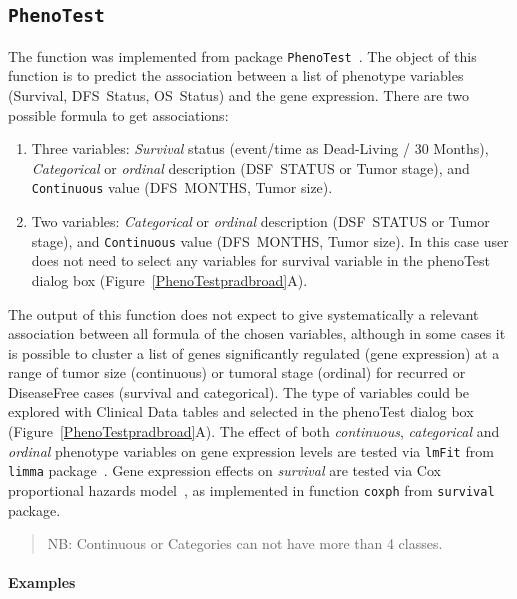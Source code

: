\documentclass[a4paper]{article}
\begin{document}
\subsection{\texttt{PhenoTest}}
The function was implemented from package \texttt{PhenoTest}~\cite{Planet2013}. The object of this function is to predict the association between a list of phenotype variables (Survival, DFS~Status, OS~Status) and the gene expression. There are two possible formula to get associations:
\begin{enumerate}
    \item Three variables: \emph{Survival} status (event/time as Dead-Living / 30 Months), \emph{Categorical} or \emph{ordinal} description (DSF~STATUS or Tumor stage), and \texttt{Continuous} value (DFS~MONTHS, Tumor size).
    \item Two variables:  \emph{Categorical} or \emph{ordinal} description (DSF~STATUS or Tumor stage), and \texttt{Continuous} value (DFS~MONTHS, Tumor size). In this case user does not need to select any variables for survival variable in the phenoTest dialog box (Figure~\ref{PhenoTestpradbroad}A).
\end{enumerate}

The output of this function does not expect to give  systematically  a relevant association between all formula of the chosen variables, although in some cases it  is possible to cluster a list of  genes significantly regulated (gene expression) at a range of tumor size (continuous)  or tumoral stage (ordinal) for recurred or DiseaseFree cases (survival and categorical). 
The type of variables could be explored with Clinical Data tables and selected in the phenoTest dialog box (Figure~\ref{PhenoTestpradbroad}A). The effect of both \emph{continuous}, \emph{categorical} and \emph{ordinal} phenotype variables on gene expression levels are tested via \texttt{lmFit} from \texttt{limma} package~\cite{Wettenhall2004}. Gene expression effects on \emph{survival} are tested via Cox proportional hazards model~\cite{Cox1972}, as implemented in function \texttt{coxph} from \texttt{survival} package.


\begin{quote}
NB: Continuous or Categories can not have more than 4 classes.
\end{quote}

\paragraph{Examples}
\end{document}
